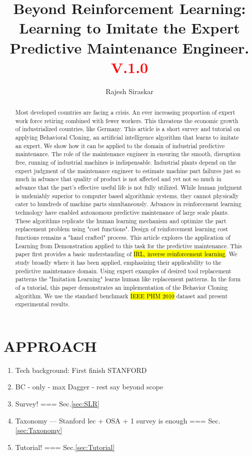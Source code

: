 \documentclass{article}
\title{Beyond Reinforcement Learning: Learning to Imitate the Expert Predictive Maintenance Engineer.\\\textcolor{red}{\small{V.1.0}}}
\author{Rajesh Siraskar}
\newcommand{\hlc}[2][blue!10]{{\colorlet{foo}{#1} \sethlcolor{foo}\hl{#2}}}
\begin{document}
\maketitle
\begin{abstract}
	Most developed countries are facing a crisis. An ever increasing proportion of expert work force retiring combined with fewer workers. This threatens the economic growth of industrialized countries, like Germany. This article is a short survey and tutorial on applying Behavioral Cloning, an artificial intelligence algorithm that learns to imitate an expert. We show how it can be applied to the domain of industrial predictive maintenance. The role of the maintenance engineer in ensuring the smooth, disruption free, running of industrial machines is indispensable. Industrial plants depend on the expert judgment of the maintenance engineer to estimate machine part failures just so much in advance that quality of product is not affected and yet not so much in advance that the part's effective useful life is not fully utilized. While human judgment is undeniably superior to computer based algorithmic systems, they cannot physically cater to hundreds of machine parts simultaneously. Advances in reinforcement learning technology have enabled autonomous predictive maintenance of large scale plants. These algorithms replicate the human learning mechanism and optimize the part replacement problem using "cost functions". Design of reinforcement learning cost functions remains a "hand crafted" process. This article explores the application of Learning from Demonstration applied to this task for the predictive maintenance. This paper first provides a basic understanding of \hlc{IRL, inverse reinforcement learning}. We study broadly where it has been applied, emphasizing their applicability to the predictive maintenance domain. Using expert examples of desired tool replacement patterns the "Imitation Learning" learns human like replacement patterns. In the form of a tutorial, this paper demonstrates an implementation of the Behavior Cloning algorithm. We use the standard benchmark \hlc{IEEE PHM 2010} dataset and present experimental results.
\end{abstract}

\clearpage
\section{APPROACH}
\begin{enumerate}
	\item Tech background: First finish STANFORD
	\item \quad BC - only - max Dagger - rest say beyond scope
	\item Survey! === Sec.\ref{sec:SLR}
	\item \quad Taxonomy --- Stanford lec + OSA + 1 survey is enough === Sec.\ref{sec:Taxonomy}
	\item Tutorial! === Sec.\ref{sec:Tutorial}
\end{enumerate}
\end{document}
